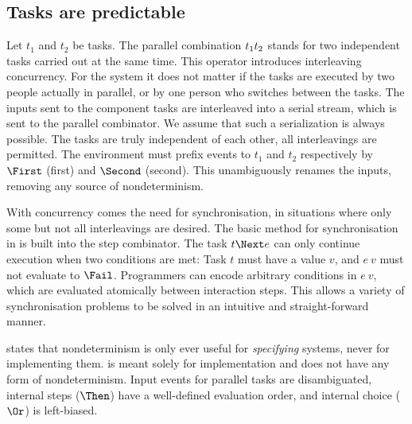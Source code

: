 \subsection{Tasks are predictable}

Let $t_1$ and $t_2$ be tasks.
The parallel combination $t_1 \relax t_2$ stands for two independent tasks carried out at the same time.
This operator introduces interleaving concurrency.
For the system it does not matter if the tasks are executed by two people actually in parallel, or by one person who switches between the tasks.
The inputs sent to the component tasks are interleaved into a serial stream, which is sent to the parallel combinator.
We assume that such a serialization is always possible.
The tasks are truly independent of each other, all interleavings are permitted.
The environment must prefix events to $t_1$ and $t_2$ respectively by $\First$ (first) and $\Second$ (second).
This unambiguously renames the inputs, removing any source of nondeterminism.

With concurrency comes the need for synchronisation, in situations where only some but not all interleavings are desired.
The basic method for synchronisation in \TOPHAT is built into the step combinator.
The task $t \Next e$ can only continue execution when two conditions are met:
Task $t$ must have a value $v$, and $e\ v$ must not evaluate to $\Fail$.
Programmers can encode arbitrary conditions in $e\ v$, which are evaluated atomically between interaction steps.
This allows a variety of synchronisation problems to be solved in an intuitive and straight-forward manner.

 states that nondeterminism is only ever useful for \emph{specifying} systems, never for implementing them.
\TOPHAT is meant solely for implementation and does not have any form of nondeterminism.
Input events for parallel tasks are disambiguated, internal steps ($\Then$) have a well-defined evaluation order, and internal choice ($\Or$) is left-biased.

%
%
%
%
%


